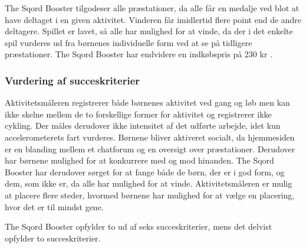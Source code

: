 The Sqord Booster tilgodeser alle præstationer, da alle får en medalje ved blot at have deltaget i en given aktivitet. Vinderen får imidlertid flere point end de andre deltagere. Spillet er lavet, så alle har mulighed for at vinde, da der i det enkelte spil vurderes ud fra børnenes individuelle form ved at se på tidligere præstationer. \citep{Sqord_family2015} \newline
The Sqord Booster har endvidere en indkøbspris på 230 kr \citep{Sqord_family2015}. 

\subsubsection{Vurdering af succeskriterier}
Aktivitetsmåleren registrerer både børnenes aktivitet ved gang og løb men kan ikke skelne mellem de to forskellige former for aktivitet og registrerer ikke cykling. Der måles derudover ikke intensitet af det udførte arbejde, idet kun accelerometerets fart vurderes. \newline
Børnene bliver aktiveret socialt, da hjemmesiden er en blanding mellem et chatforum og en oversigt over præstationer. Derudover har børnene mulighed for at konkurrere med og mod hinanden. The Sqord Booster har derudover sørget for at fange både de børn, der er i god form, og dem, som ikke er, da alle har mulighed for at vinde. Aktivitetsmåleren er mulig at placere flere steder, hvormed børnene har mulighed for at vælge en placering, hvor det er til mindst gene.

The Sqord Booster opfylder to ud af seks succeskriterier, mens det delvist opfylder to succeskriterier.

